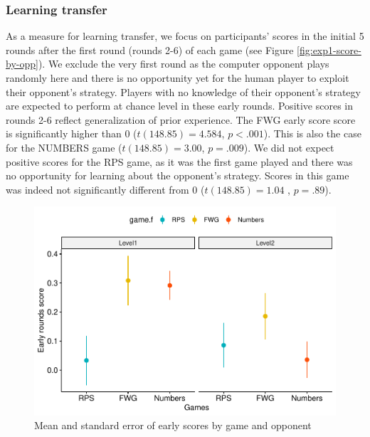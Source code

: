 \documentclass[man,floatsintext]{apa6}
\begin{document}
\hypertarget{learning-transfer}{%
\subsubsection{Learning transfer}\label{learning-transfer}}

As a measure for learning transfer, we focus on participants' scores in the initial 5 rounds after the first round (rounds 2-6) of each game (see Figure \ref{fig:exp1-score-by-opp}). We exclude the very first round as the computer opponent plays randomly here and there is no opportunity yet for the human player to exploit their opponent's strategy. Players with no knowledge of their opponent's strategy are expected to perform at chance level in these early rounds. Positive scores in rounds 2-6 reflect generalization of prior experience. The FWG early score score is significantly higher than 0 (\(t(148.85) = 4.584\), \(p < .001\)). This is also the case for the NUMBERS game (\(t(148.85) = 3.00\), \(p = .009\)). We did not expect positive scores for the RPS game, as it was the first game played and there was no opportunity for learning about the opponent's strategy. Scores in this game was indeed not significantly different from 0 (\(t(148.85) = 1.04\) , \(p = .89\)).



\begin{figure}

{\centering \includegraphics{paper_draft_2021_files/figure-latex/exp1-early-score-by-opp-1} 

}

\caption{Mean and standard error of early scores by game and opponent}\label{fig:exp1-early-score-by-opp}
\end{figure}
\end{document}
